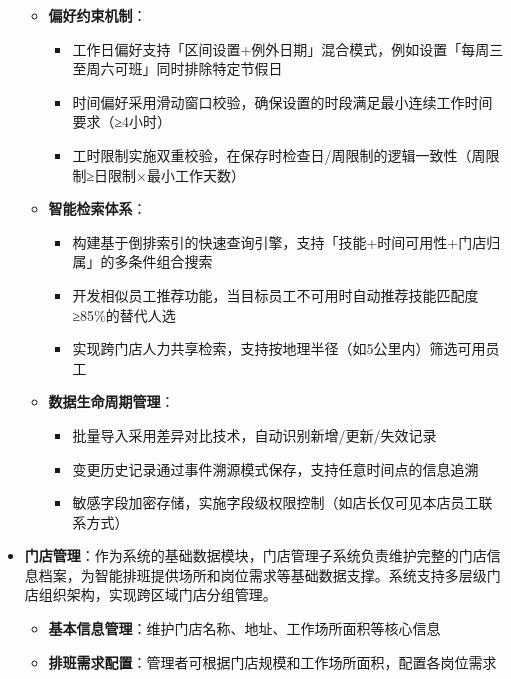 \documentclass{ctexart}
\begin{document}
\begin{itemize}
\begin{itemize}
        \item \textbf{偏好约束机制}：
            \begin{itemize}
                \item 工作日偏好支持「区间设置+例外日期」混合模式，例如设置「每周三至周六可班」同时排除特定节假日
                \item 时间偏好采用滑动窗口校验，确保设置的时段满足最小连续工作时间要求（≥4小时）
                \item 工时限制实施双重校验，在保存时检查日/周限制的逻辑一致性（周限制≥日限制×最小工作天数）
            \end{itemize}
        
        \item \textbf{智能检索体系}：
            \begin{itemize}
                \item 构建基于倒排索引的快速查询引擎，支持「技能+时间可用性+门店归属」的多条件组合搜索
                \item 开发相似员工推荐功能，当目标员工不可用时自动推荐技能匹配度≥85\%的替代人选
                \item 实现跨门店人力共享检索，支持按地理半径（如5公里内）筛选可用员工
            \end{itemize}
        
        \item \textbf{数据生命周期管理}：
            \begin{itemize}
                \item 批量导入采用差异对比技术，自动识别新增/更新/失效记录
                \item 变更历史记录通过事件溯源模式保存，支持任意时间点的信息追溯
                \item 敏感字段加密存储，实施字段级权限控制（如店长仅可见本店员工联系方式）
            \end{itemize}
    \end{itemize}
    
    \item \textbf{门店管理}：作为系统的基础数据模块，门店管理子系统负责维护完整的门店信息档案，为智能排班提供场所和岗位需求等基础数据支撑。系统支持多层级门店组织架构，实现跨区域门店分组管理。
        \begin{itemize}
            \item \textbf{基本信息管理}：维护门店名称、地址、工作场所面积等核心信息
            \item \textbf{排班需求配置}：管理者可根据门店规模和工作场所面积，配置各岗位需求
        \end{itemize}
    

\end{itemize}
\end{document}
